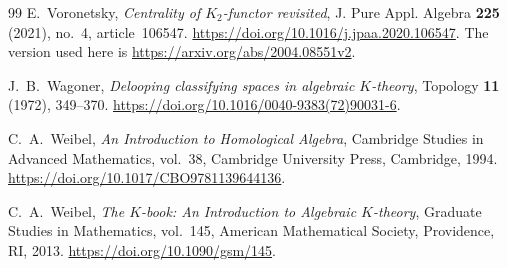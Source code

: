 \documentclass[11pt]{amsart}
\theoremstyle{definition}
\theoremstyle{remark}
\numberwithin{equation}{section}
\begin{document}
\begin{thebibliography}{99}
E.~Voronetsky, \emph{Centrality of $K_2$-functor revisited}, J. Pure Appl. Algebra \textbf{225} (2021), no.~4, article~106547. \url{https://doi.org/10.1016/j.jpaa.2020.106547}. The version used here is \url{https://arxiv.org/abs/2004.08551v2}.

J.~B.~Wagoner, \emph{Delooping classifying spaces in algebraic $K$-theory}, Topology \textbf{11} (1972), 349--370. \url{https://doi.org/10.1016/0040-9383(72)90031-6}.

C.~A.~Weibel, \emph{An Introduction to Homological Algebra}, Cambridge Studies in Advanced Mathematics, vol.~38, Cambridge University Press, Cambridge, 1994. \url{https://doi.org/10.1017/CBO9781139644136}.

C.~A.~Weibel, \emph{The $K$-book: An Introduction to Algebraic $K$-theory}, Graduate Studies in Mathematics, vol.~145, American Mathematical Society, Providence, RI, 2013. \url{https://doi.org/10.1090/gsm/145}.

\end{thebibliography}
\end{document}
